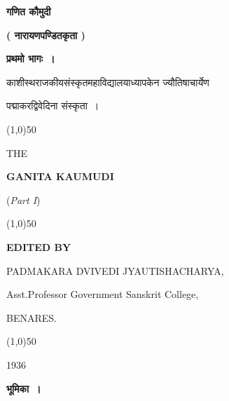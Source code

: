 \documentclass[11pt, openany]{book}
\begin{document}
\begin{center}
{\Huge \textbf{गणित कौमुदी}}
\vspace{4mm}

{\LARGE \textbf{( नारायणपण्डितकृता )}}
\vspace{4mm}

{\Large \textbf{प्रथमो भागः~।}}
\vspace{6mm}

काशीस्थराजकीयसंस्कृतमहाविद्यालयाध्यापकेन ज्यौतिषाचार्येण\\
\vspace{2mm}

पद्माकरद्विवेदिना संस्कृता~।
\vspace{6mm}

\line(1,0){50}
\vspace{6mm}

{\Large THE}
\vspace{6mm}

{\huge \textbf{GANITA KAUMUDI}}
\vspace{4mm}

{\Large (\textit{Part I})}
\vspace{6mm}

\line(1,0){50}
\vspace{8mm}

{\small \textbf{EDITED BY\textendash} }\\
\vspace{2mm}

PADMAKARA DVIVEDI JYAUTISHACHARYA,\\
\vspace{2mm}

Asst.\;Professor Government Sanskrit College,\\
\vspace{2mm}

BENARES.
\vspace{4mm}

\line(1,0){50}
\vspace{4mm}

1936
\end{center}

\newpage
\thispagestyle{empty}

\begin{center}
{\Large \textbf{भूमिका~।}}
\end{center}
\end{document}
